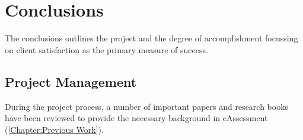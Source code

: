 \chapter{Conclusions} \label{Chapter: Conclusions}

\begin{preamble}
	The conclusions outlines the project and the degree of accomplishment focussing on client satisfaction as the primary measure of success.
\end{preamble}


%
%
%
%
%
%

\section{Project Management}

During the project process, a number of important papers and research books have been reviewed to provide the necessary background in eAssessment (\autoref{Chapter:Previous Work}).

